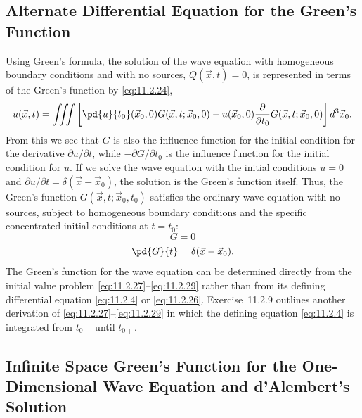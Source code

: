 \subsection{Alternate Differential Equation for the Green's Function}
\label{subsec:alt-de-greens-wave}

Using Green's formula, the solution of the wave equation with homogeneous boundary conditions and with no sources, $Q(\vec{x},t) = 0$, is represented in terms of the Green's function by \eqref{eq:11.2.24},
\[
u(\vec{x},t) = \iiint \left[\pd{u}{t_0}(\vec{x}_0,0)G(\vec{x},t;\vec{x}_0,0) - u(\vec{x}_0,0)\frac{\partial}{\partial t_0}G(\vec{x},t;\vec{x}_0,0)\right] d^3\vec{x}_0.
\]
From this we see that $G$ is also the influence function for the initial condition for the derivative $\partial u/\partial t$, while $-\partial G/\partial t_0$ is the influence function for the initial condition for $u$.  If we solve the wave equation with the initial conditions $u = 0$ and $\partial u/\partial t = \delta(\vec{x} - \vec{x}_0)$, the solution is the Green's function itself.  Thus, the Green's function $G(\vec{x},t;\vec{x}_0,t_0)$ satisfies the ordinary wave equation with no sources,
subject to homogeneous boundary conditions and the specific concentrated initial conditions at $t = t_0$:
\begin{equation}
\label{eq:11.2.28}
G = 0
\end{equation}
\begin{equation}
\label{eq:11.2.29}
\pd{G}{t} = \delta(\vec{x} - \vec{x}_0).
\end{equation}
The Green's function for the wave equation can be determined directly from the initial value problem \eqref{eq:11.2.27}--\eqref{eq:11.2.29} rather than from its defining differential equation \eqref{eq:11.2.4} or \eqref{eq:11.2.26}.  Exercise~11.2.9 outlines another derivation of \eqref{eq:11.2.27}--\eqref{eq:11.2.29} in which the defining equation \eqref{eq:11.2.4} is integrated from $t_{0-}$ until $t_{0+}$.

\subsection{Infinite Space Green's Function for the One-Dimensional Wave Equation and d'Alembert's Solution}
\label{subsec:1d-greens-wave}

